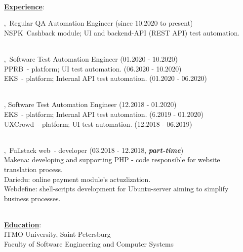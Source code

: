 \documentclass[hidelinks,12pt,a4paper,oneside]{article}
\newcommand*\simpleruleline[1]{\par\noindent\raisebox{.8ex}{\makebox[\linewidth]{\hrulefill\hspace{#1}}}}
\begin{document}
\vspace{-15px}
\ \\
{\Large \underline{\textbf{Experience}}}:
\begin{addmargin}[1em]{2em}%
\vspace{11px}
{\large
\textquotesingle \href{https://www.luxoft.com/}{}\textquotesingle,\ Regular QA Automation Engineer {\small(since 10.2020 to present)}} \\
\textcolor{marengo} {
	{\small \textquotesingle NSPK\textquotesingle\ Cashback module;  UI and backend-API (REST API) test automation.}
}
\simpleruleline{6ex} \\
{\large
\textquotesingle \href{https://www.sberbank.ru/}{}\textquotesingle,\ Software Test Automation Engineer {\small(01.2020 - 10.2020)}} \\
\textcolor{marengo} {
	{\small \textquotesingle PPRB\textquotesingle\ - platform; UI test automation.}  {\scriptsize (06.2020 - 10.2020)} \\
	{\small \textquotesingle EKS\textquotesingle\ - platform; Internal API test automation.} {\scriptsize (01.2020 - 06.2020)}
}
\simpleruleline{6ex} \\
{\large
\textquotesingle \href{https://www.performance-lab.ru/}{}\textquotesingle, Software Test Automation Engineer {\small(12.2018 - 01.2020)}} \\
\textcolor{marengo} {
	{\small \textquotesingle EKS\textquotesingle\ - platform; Internal API test automation.} {\scriptsize (6.2019 - 01.2020)} \\
	{\small \textquotesingle UXCrowd\textquotesingle\ - platform; UI test automation.} {\scriptsize (12.2018 - 06.2019)}
}
\simpleruleline{6ex} \\
{\large
\textquotesingle \href{https://webdefine.net/}{}\textquotesingle,\ Fullstack web\ - developer {\small(03.2018 - 12.2018, \emph{\textbf{part-time}})}} \\
\textcolor{marengo} {
	{\small \textquotesingle Makena\textquotesingle: developing and supporting PHP - code responsible for website translation process.} \\
	{\small \textquotesingle Dariedu\textquotesingle: online payment module's actuzlization.} \\
	{\small \textquotesingle Webdefine\textquotesingle:  shell-scripts development for Ubuntu-server aiming to simplify business processes.}
}
\end{addmargin}
\ \\
{\Large \underline{\textbf{Education}}}: \\ [8px]
{\large ITMO University, Saint-Petersburg} \\
Faculty of Software Engineering and Computer Systems
\end{document}
